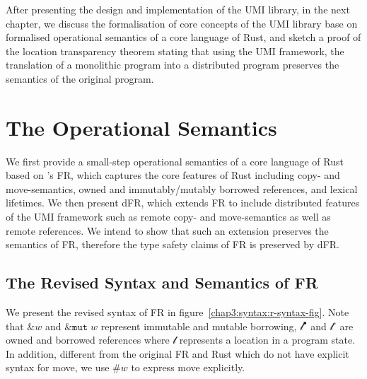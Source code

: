 After presenting the design and implementation of the UMI library, in the next chapter, we discuss the formalisation of core concepts of the UMI library base on formalised operational semantics of a core language of Rust, and sketch a proof of the location transparency theorem stating that using the UMI framework, the translation of a monolithic program into a distributed program preserves the semantics of the original program.

\section{The Operational Semantics}
\label{chap3:semantics}
We first provide a small-step operational semantics of a core language of Rust based on \citet{10.1145/3443420}'s FR, which captures the core features of Rust including copy- and move-semantics, owned and immutably/mutably borrowed references, and lexical lifetimes. We then present dFR, which extends FR to include distributed features of the UMI framework such as remote copy- and move-semantics as well as remote references. We intend to show that such an extension preserves the semantics of FR, therefore the type safety claims of FR is preserved by dFR.

\subsection{The Revised Syntax and Semantics of FR}
\label{chap3:semantics:fr}
We present the revised syntax of FR in figure~\ref{chap3:syntax:r-syntax-fig}. Note that $\&w$ and $\&\texttt{mut}\;w$ represent immutable and mutable borrowing, $\mathscr{l}^\bullet$ and $\mathscr{l}^\circ$ are owned and borrowed references where $\mathscr{l}$ represents a location in a program state. In addition, different from the original FR and Rust which do not have explicit syntax for move, we use $\#w$ to express move explicitly.


